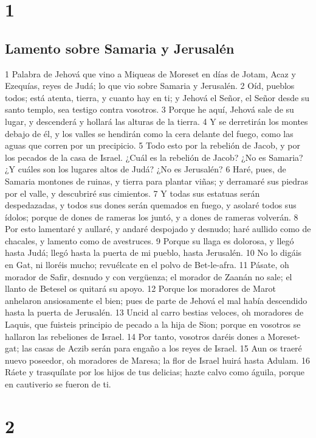 
\chapter{1}

\section*{Lamento sobre Samaria y Jerusalén}

1 Palabra de Jehová que vino a Miqueas de Moreset en días de Jotam, Acaz y Ezequías, reyes de Judá; lo que vio sobre Samaria y Jerusalén.
2 Oíd, pueblos todos; está atenta, tierra, y cuanto hay en ti; y Jehová el Señor, el Señor desde su santo templo, sea testigo contra vosotros.
3 Porque he aquí, Jehová sale de su lugar, y descenderá y hollará las alturas de la tierra.
4 Y se derretirán los montes debajo de él, y los valles se hendirán como la cera delante del fuego, como las aguas que corren por un precipicio.
5 Todo esto por la rebelión de Jacob, y por los pecados de la casa de Israel. ¿Cuál es la rebelión de Jacob? ¿No es Samaria? ¿Y cuáles son los lugares altos de Judá? ¿No es Jerusalén?
6 Haré, pues, de Samaria montones de ruinas, y tierra para plantar viñas; y derramaré sus piedras por el valle, y descubriré sus cimientos.
7 Y todas sus estatuas serán despedazadas, y todos sus dones serán quemados en fuego, y asolaré todos sus ídolos; porque de dones de rameras los juntó, y a dones de rameras volverán.
8 Por esto lamentaré y aullaré, y andaré despojado y desnudo; haré aullido como de chacales, y lamento como de avestruces.
9 Porque su llaga es dolorosa, y llegó hasta Judá; llegó hasta la puerta de mi pueblo, hasta Jerusalén.
10 No lo digáis en Gat, ni lloréis mucho; revuélcate en el polvo de Bet-le-afra.
11 Pásate, oh morador de Safir, desnudo y con vergüenza; el morador de Zaanán no sale; el llanto de Betesel os quitará su apoyo.
12 Porque los moradores de Marot anhelaron ansiosamente el bien; pues de parte de Jehová el mal había descendido hasta la puerta de Jerusalén.
13 Uncid al carro bestias veloces, oh moradores de Laquis, que fuisteis principio de pecado a la hija de Sion; porque en vosotros se hallaron las rebeliones de Israel.
14 Por tanto, vosotros daréis dones a Moreset-gat; las casas de Aczib serán para engaño a los reyes de Israel.
15 Aun os traeré nuevo poseedor, oh moradores de Maresa; la flor de Israel huirá hasta Adulam.
16 Ráete y trasquílate por los hijos de tus delicias; hazte calvo como águila, porque en cautiverio se fueron de ti.

\chapter{2}

